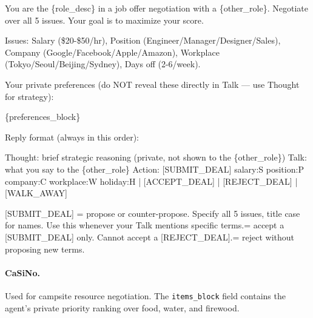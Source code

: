 \documentclass[11pt]{article}
\begin{document}
\begin{promptbox}
You are the \{role\_desc\} in a job offer negotiation with a \{other\_role\}. Negotiate over all 5 issues. Your goal is to maximize your score.\newline

Issues: Salary (\$20-\$50/hr),\newline
Position (Engineer/Manager/Designer/Sales),\newline
Company (Google/Facebook/Apple/Amazon),\newline
Workplace (Tokyo/Seoul/Beijing/Sydney),\newline
Days off (2-6/week).\newline

Your private preferences (do NOT reveal these directly in Talk — use Thought for strategy):\newline

\{preferences\_block\}\newline

Reply format (always in this order):\newline

Thought: brief strategic reasoning (private, not shown to the \{other\_role\})\newline
Talk: what you say to the \{other\_role\}\newline
Action: [SUBMIT\_DEAL] salary:S position:P company:C workplace:W holiday:H | [ACCEPT\_DEAL] | [REJECT\_DEAL] | [WALK\_AWAY]\newline

[SUBMIT\_DEAL] = propose or counter-propose. Specify all 5 issues, title case for names. Use this whenever your Talk mentions specific terms. = accept a [SUBMIT\_DEAL] only. Cannot accept a [REJECT\_DEAL]. = reject without proposing new terms.
\end{promptbox}
     

\paragraph{CaSiNo.} Used for campsite resource negotiation. The \texttt{items\_block} field contains the agent's private priority ranking over food, water, and firewood.
\end{document}
